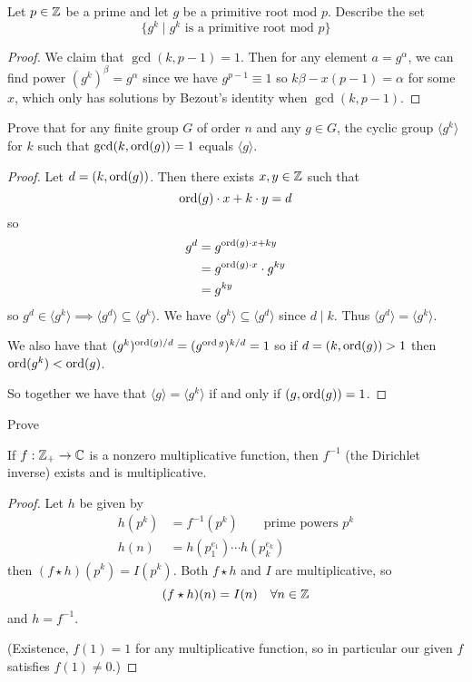\begin{problem}
Let $p\in\mathbb Z$ be a prime and let $g$ be a primitive root mod $p$. Describe the set
\[\{g^k\mid g^k \text{ is a primitive root mod $p$}\}\]
\end{problem}
\begin{proof}
    We claim that $\gcd(k, p-1) = 1$. Then for any element $a = g^\alpha$, we can find power $(g^k)^\beta = g^\alpha$ since we have $g^{p-1}\equiv 1$ so $k\beta - x(p-1) = \alpha$ for some $x$, which only has solutions by Bezout's identity when $\gcd(k, p-1)$.
\end{proof}

\begin{lemma*}
    Prove that for any finite group $G$ of order $n$ and any $g\in G$, the cyclic group $\langle g^k\rangle$ for $k$ such that $\gcd(k, \operatorname{ord}(g)) = 1$ equals $\langle g\rangle$.
\end{lemma*}
\begin{proof}
    Let $d = (k, \operatorname{ord}(g))$. Then there exists $x, y\in\mathbb Z$ such that
    \[\operatorname{ord}(g)\cdot x + k\cdot y = d\]
    so
    \begin{align*}
        g^d & = g^{\operatorname{ord}(g)\cdot x + ky}        \\
            & = g^{\operatorname{ord}(g)\cdot x}\cdot g^{ky} \\
            & = g^{ky}
    \end{align*}
    so $g^d\in \langle g^k\rangle \implies \langle g^d\rangle \subseteq \langle g^k\rangle$. We have $\langle g^k\rangle\subseteq \langle g^d\rangle$ since $d\mid k$. Thus $\langle g^d\rangle = \langle g^k\rangle$.

    We also have that $(g^k)^{\operatorname{ord}(g)/d} = (g^{\operatorname{ord}{g}})^{k/d} = 1$ so if $d = (k, \operatorname{ord}(g))>1$ then $\operatorname{ord}(g^k)< \operatorname{ord}(g)$.

    So together we have that $\langle g\rangle = \langle g^k\rangle$ if and only if $(g, \operatorname{ord}(g))=1$.
\end{proof}

\begin{problem}
Prove
\begin{proposition*}
    If $f : \mathbb Z_+\to \mathbb C$ is a nonzero multiplicative function, then $f^{-1}$ (the Dirichlet inverse) exists and is multiplicative.
\end{proposition*}
\end{problem}
\begin{proof}
    Let $h$ be given by
    \begin{align*}
        h(p^k) & = f^{-1}(p^k)\qquad\text{prime powers $p^k$} \\
        h(n)   & = h(p_1^{e_1})\cdots h(p_k^{e_k})
    \end{align*}
    then $(f\star h)(p^k) = I(p^k)$. Both $f\star h$ and $I$ are multiplicative, so
    \[(f\star h)(n) = I(n)\quad\forall n\in\mathbb Z\]
    and $h = f^{-1}$.

    (Existence, $f(1) = 1$ for any multiplicative function, so in particular our given $f$ satisfies $f(1)\neq 0$.)
\end{proof}

